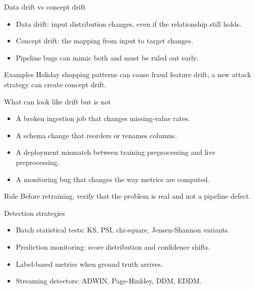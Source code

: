 \begin{frame}{Data drift vs concept drift}
\begin{itemize}
\item Data drift: input distribution changes, even if the relationship still holds.
\item Concept drift: the mapping from input to target changes.
\item Pipeline bugs can mimic both and must be ruled out early.
\end{itemize}
\begin{block}{Examples}
Holiday shopping patterns can cause fraud feature drift; a new attack strategy can create concept drift.
\end{block}
\coursefooter
\end{frame}

\begin{frame}{What can look like drift but is not}
\begin{itemize}
\item A broken ingestion job that changes missing-value rates.
\item A schema change that reorders or renames columns.
\item A deployment mismatch between training preprocessing and live preprocessing.
\item A monitoring bug that changes the way metrics are computed.
\end{itemize}
\begin{block}{Rule}
Before retraining, verify that the problem is real and not a pipeline defect.
\end{block}
\coursefooter
\end{frame}

\begin{frame}{Detection strategies}
\begin{itemize}
\item Batch statistical tests: KS, PSI, chi-square, Jensen-Shannon variants.
\item Prediction monitoring: score distribution and confidence shifts.
\item Label-based metrics when ground truth arrives.
\item Streaming detectors: ADWIN, Page-Hinkley, DDM, EDDM.
\end{itemize}
\coursefooter
\end{frame}

